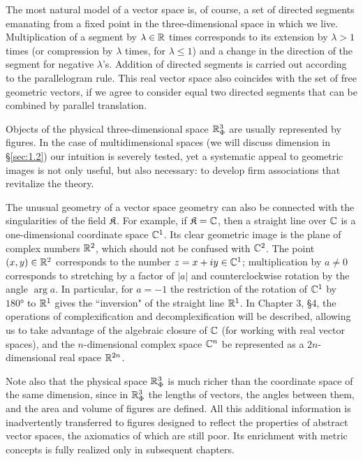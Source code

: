 The most natural model of a vector space is, of course, a set of directed segments emanating from a fixed point in the three-dimensional space in which we live. Multiplication of a segment by $\lambda \in {\mathbb{R}}$ times corresponds to its extension by $\lambda > 1$ times (or compression by $\lambda$ times, for $\lambda\le 1$) and a change in the direction of the segment for negative $\lambda$'s. Addition of directed segments is carried out according to the parallelogram rule. This real vector space also coincides with the set of free geometric vectors, if we agree to consider equal two directed segments that can be combined by parallel translation.

Objects of the physical three-dimensional space ${\mathbb{R}}_\Phi^3$ are usually represented by figures. In the case of multidimensional spaces (we will discuss dimension in \S\ref{sec:1.2}) our intuition is severely tested, yet a systematic appeal to geometric images is not only useful, but also necessary: to develop firm associations that revitalize the theory.

The unusual geometry of a vector space geometry can also be connected with the singularities of the field ${\mathfrak{K}}$. For example, if ${\mathfrak{K}} = {\mathbb{C}}$, then a straight line over ${\mathbb{C}}$ is a one-dimensional coordinate space ${\mathbb{C}}^1$. Its clear geometric image is the plane of complex numbers ${\mathbb{R}}^2$, which should not be confused with ${\mathbb{C}}^2$. The point $(x, y) \in {\mathbb{R}}^2$ corresponds to the number $z = x + iy\in {\mathbb{C}}^1$; multiplication by $a\ne 0$ corresponds to stretching by a factor of $|a|$ and counterclockwise rotation by the angle $\arg a$. In particular, for $a=-1$ the restriction of the rotation of ${\mathbb{C}}^1$ by $\ang{180}$ to ${\mathbb{R}}^1$ gives the ``inversion" of the straight line ${\mathbb{R}}^1$. In Chapter 3, \S4, the operations of complexification and decomplexification will be described, allowing us to take advantage of the algebraic closure of ${\mathbb{C}}$ (for working with real vector spaces), and the $n$-dimensional complex space ${\mathbb{C}}^n$ be represented as a $2n$-dimensional real space ${\mathbb{R}}^{2n}$.

Note also that the physical space ${\mathbb{R}}_\Phi^3$ is much richer than the coordinate space of the same dimension, since in ${\mathbb{R}}_\Phi^3$ the lengths of vectors, the angles between them, and the area and volume of figures are defined. All this additional information is inadvertently transferred to figures designed to reflect the properties of abstract vector spaces, the axiomatics of which are still poor. Its enrichment with metric concepts is fully realized only in subsequent chapters.

